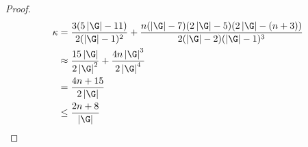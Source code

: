 \documentclass[11pt,letterpaper]{article}
\theoremstyle{definition}
\newcommand{\6}{\mathbf}
\newcommand{\7}{\mathcal}
\begin{document}
\begin{proof}
\begin{align*}
    \kappa &=  \frac{3 (5 \left|\G\right|-11)}{2 (\left|\G\right|-1)^2} + \frac{n(\left|\G\right|-7) (2 \left|\G\right|-5) (2 \left|\G\right|-(n+3))}{2(\left|\G\right|-2) (\left|\G\right|-1)^3} \\
    &\approx  \frac{15 \left|\G\right|}{2 \left|\G\right|^2} + \frac{ 4 n\left|\G\right|^3}{2\left|\G\right|^4} \\
    &= \frac{4n + 15}{2 \left|\G\right|} \\
    & \leq \frac{2n + 8}{\left|\G\right|}
\end{align*}
\end{proof}
\end{document}

